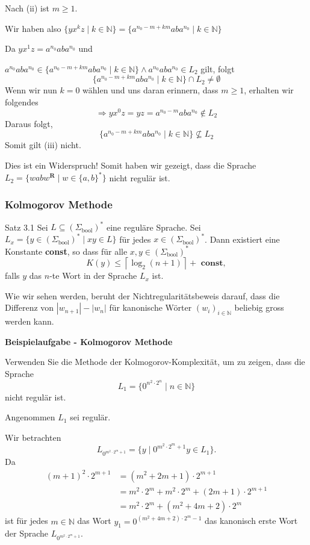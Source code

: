 \documentclass[a4paper, 11pt]{article}
\def\N{\mathbb{N}}
\newcommand\myTitle[1]{{\large \textbf {#1}}}
\begin{document}
Nach (ii) ist $m \geq 1$. 

Wir haben also $\{yx^kz \mid k \in \mathbb{N} \} = \{a^{n_0-m+km}aba^{n_0} \mid k \in \mathbb{N} \}$

    Da $yx^1z = a^{n_0}aba^{n_0}$ und

$a^{n_0}aba^{n_0} \in \{a^{n_0-m+km}aba^{n_0} \mid k \in \mathbb{N} \} \land  a^{n_0}aba^{n_0} \in L_2$ gilt, folgt 
$$\{a^{n_0-m+km}aba^{n_0} \mid k \in \mathbb{N} \}  \cap L_2 \neq \emptyset$$
Wenn wir nun $k = 0$ wählen und uns daran erinnern, dass $m \geq 1$, erhalten wir folgendes
$$\Rightarrow yx^0z = yz = a^{n_0-m}aba^{n_0} \notin L_2$$
Daraus folgt,
$$\{a^{n_0-m+km}aba^{n_0} \mid k \in \N \} \nsubseteq L_2$$
Somit gilt (iii) nicht.

Dies ist ein Widerspruch! Somit haben wir gezeigt, dass die Sprache $L_2 = \{wabw^{\textbf{R}} \mid w \in \{a,b\}^*\}$ nicht regulär ist.




    \subsubsection{Kolmogorov Methode}
    \begin{mainbox}{Satz 3.1}
        Sei $L \subseteq (\Sigma_{\text{bool}})^*$ eine reguläre Sprache. Sei $L_x = \{y \in (\Sigma_{\text{bool}})^* \mid xy \in L\}$ für jedes $x\in (\Sigma_{\text{bool}})^*$. Dann existiert eine Konstante \textbf{const}, so dass für alle $x, y \in (\Sigma_\text{bool})^*$
        $$K(y) \leq \left\lceil \log_2(n+1)\right\rceil + \textbf{ const},$$
        falls $y$ das $n$-te Wort in der Sprache $L_x$ ist.
    \end{mainbox}
    Wie wir sehen werden, beruht der Nichtregularitätsbeweis darauf, dass die Differenz von $|w_{n+1}| - |w_n|$ für kanonische Wörter $(w_i)_{i \in \N}$ beliebig gross werden kann.



    \myTitle{Beispielaufgabe - Kolmogorov Methode}

    Verwenden Sie die Methode der Kolmogorov-Komplexität, um zu zeigen, dass die Sprache 
    $$L_1 = \{0^{n^2 \cdot 2^n} \mid n \in \N\}$$
    nicht regulär ist.

    Angenommen $L_1$ sei regulär. 
    
    Wir betrachten 
    $$L_{0^{m^2 \cdot 2^m + 1}} = \{y \mid 0^{m^2 \cdot 2^m + 1}y \in L_1\}.$$
    Da
    \begin{align*}
        (m+1)^2 \cdot 2^{m+1} &= (m^2 + 2m + 1)\cdot 2^{m+1}\\
        &= m^2 \cdot 2^m + m^2 \cdot 2^m + (2m + 1) \cdot 2^{m+1}\\
        &= m^2 \cdot 2^m + (m^2 + 4m + 2) \cdot 2^m
    \end{align*}
    ist für jedes $m \in \N$ das Wort $y_1 = 0^{(m^2 + 4m + 2) \cdot 2^m - 1}$ das kanonisch erste Wort der Sprache $L_{0^{m^2\cdot 2^m +1}}$.
\end{document}
